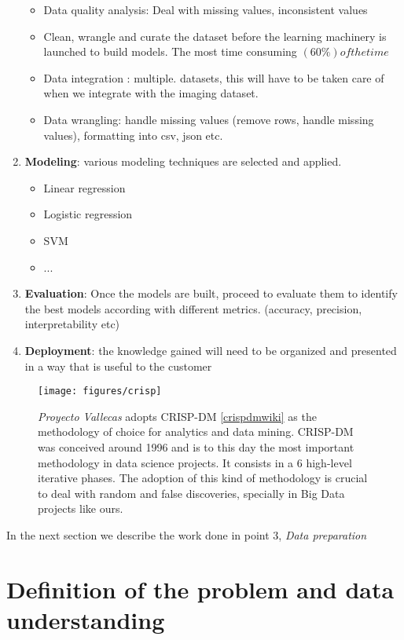 \documentclass[11pt]{article}
\begin{document}
\begin{enumerate}
\begin{itemize}
		\item Data quality analysis: Deal with missing values, inconsistent values
		\item Clean, wrangle and curate the dataset before the learning machinery is launched to build models. The most time consuming $(60\%) of the time$
		\item Data integration : multiple. datasets, this will have to be taken care of when we integrate with the imaging dataset.
		\item Data wrangling: handle missing values (remove rows, handle missing values), formatting into csv, json etc.
	\end{itemize}
\item \textbf{Modeling}: various modeling techniques are selected and applied.
	\begin{itemize}
		\item Linear regression 
		\item Logistic regression
		\item SVM
		\item ...
	\end{itemize}
\item \textbf{Evaluation}: Once the models are built, proceed to evaluate them to identify the best models according with different metrics. (accuracy, precision, interpretability etc)
\item \textbf{Deployment}: the knowledge gained will need to be organized and presented in a way that is useful to the customer
\end{enumerate}


\begin{figure}[h!]
        \centering
        \texttt{[image: figures/crisp]}
        \caption{\emph{Proyecto Vallecas} adopts CRISP-DM \ref{crispdmwiki} as the methodology of choice for analytics and data mining. CRISP-DM was conceived around 1996  and is to this day the most important methodology in data science projects. It consists in a 6 high-level iterative phases. The adoption of this kind of methodology is crucial to deal with random and false discoveries, specially in Big Data projects like ours.}
\label{fig:tableclustervallecas}
\end{figure}

In the next section we describe the work done in point 3, \emph{Data preparation}

\section{Definition of the problem and data understanding}
\label{se:biz}
\end{document}
